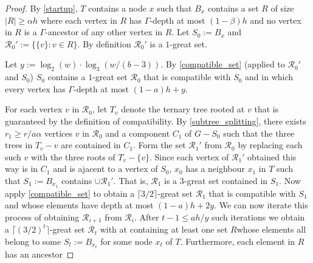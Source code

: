\documentclass{patmorin}
\begin{document}
\begin{proof}
  By \cref{startup}, $T$ contains a node $x$ such that $B_x$ contains a set $R$ of size $|R|\ge \alpha h$ where each vertex in $R$ has $\Gamma$-depth at most $(1-\beta)h$ and no vertex in $R$ is a $\Gamma$-ancestor of any other vertex in $R$.  Let $S_0:=B_x$ and $\mathcal{R}_0':=\{\{v\}:v\in R\}$.  By definition $\mathcal{R}_0'$ is a $1$-great set.



  Let $y:=\log_2(w)\cdot\log_3(w/(b-3))$.  By \cref{compatible_set} (applied to $\mathcal{R}_0'$ and $S_0$) $S_0$ contains a $1$-great set $\mathcal{R}_0$ that is compatible with $S_0$ and in which every vertex has $\Gamma$-depth at most $(1-a)h+y$.  

  For each vertex $v$ in $\mathcal{R}_0$, let $T_v$ denote the ternary tree rooted at $v$ that is guaranteed by the definition of compatibility. By \cref{subtree_splitting}, there exists $r_1\ge r/a\alpha$ vertices $v$ in $\mathcal{R}_0$ and a component $C_1$ of $G-S_0$ such that the three trees in $T_v-v$ are contained in $C_1$.  Form the set $\mathcal{R}_1'$ from $\mathcal{R}_0$ by replacing each such $v$ with the three roots of $T_v-\{v\}$.   Since each vertex of $\mathcal{R}_1'$ obtained this way is in $C_1$ and is ajacent to a vertex of $S_0$, $x_0$ has a neighbour $x_1$ in $T$ such that $S_1:=B_{x_1}$ contains $\cup\mathcal{R}_1'$.  That is, $\mathcal{R}_1$ is a $3$-great set contained in $S_1$.  Now apply \cref{compatible_set} to obtain a $\lceil 3/2\rceil$-great set $\mathcal{R}_1$ that is compatible with $S_1$ and whose elements have depth at most $(1-a)h+2y$.  We can now iterate this process of obtaining $\mathcal{R}_{i+1}$ from $\mathcal{R}_i$.  After $t-1\le ah/y$ such iterations we obtain a $\lceil(3/2)^t\rceil$-great set $\mathcal{R}_t$ with at containing at least one set $R$whose elements all belong to some $S_t:=B_{x_{t}}$ for some node $x_t$ of $T$.  Furthermore, each element in $R$ has an ancestor 
\end{proof}
\end{document}
